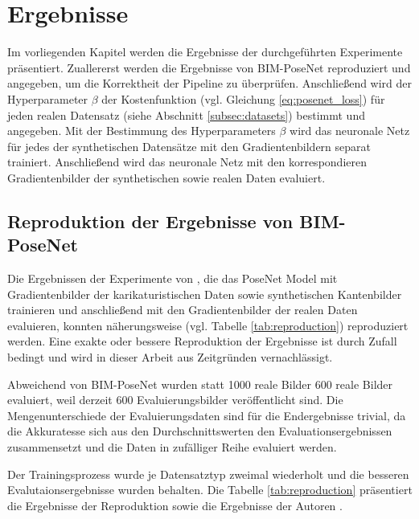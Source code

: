 
\section{Ergebnisse}
Im vorliegenden Kapitel werden die Ergebnisse der durchgeführten Experimente präsentiert. Zuallererst werden die Ergebnisse von BIM-PoseNet \cite{acharyaBIMPoseNetIndoorCamera2019} reproduziert und angegeben, um die Korrektheit der Pipeline zu überprüfen. Anschließend wird der Hyperparameter $\beta$ der Kostenfunktion (vgl. Gleichung \ref{eq:posenet_loss}) für jeden realen Datensatz (siehe Abschnitt \ref{subsec:datasets}) bestimmt und angegeben. Mit der Bestimmung des Hyperparameters $\beta$ wird das neuronale Netz für jedes der synthetischen Datensätze mit den Gradientenbildern separat trainiert. Anschließend wird das neuronale Netz mit den korrespondieren Gradientenbilder der synthetischen sowie realen Daten evaluiert.

\subsection{Reproduktion der Ergebnisse von BIM-PoseNet}
Die Ergebnissen der Experimente von \citet{acharyaBIMPoseNetIndoorCamera2019}, die das PoseNet Model mit Gradientenbilder der karikaturistischen Daten sowie synthetischen Kantenbilder trainieren und anschließend mit den Gradientenbilder der realen Daten evaluieren, konnten näherungsweise (vgl. Tabelle \ref{tab:reproduction}) reproduziert werden. Eine exakte oder bessere Reproduktion der Ergebnisse ist durch Zufall bedingt und wird in dieser Arbeit aus Zeitgründen vernachlässigt.

Abweichend von BIM-PoseNet wurden statt 1000 reale Bilder 600 reale Bilder evaluiert, weil derzeit 600 Evaluierungsbilder veröffentlicht sind. Die Mengenunterschiede der Evaluierungsdaten sind für die Endergebnisse trivial, da die Akkuratesse sich aus den Durchschnittswerten den Evaluationsergebnissen zusammensetzt und die Daten in zufälliger Reihe evaluiert werden. 

Der Trainingsprozess wurde je Datensatztyp zweimal wiederholt und die besseren Evalutaionsergebnisse wurden behalten. Die Tabelle \ref{tab:reproduction} präsentiert die Ergebnisse der Reproduktion sowie die Ergebnisse der Autoren \citet{acharyaBIMPoseNetIndoorCamera2019}.


